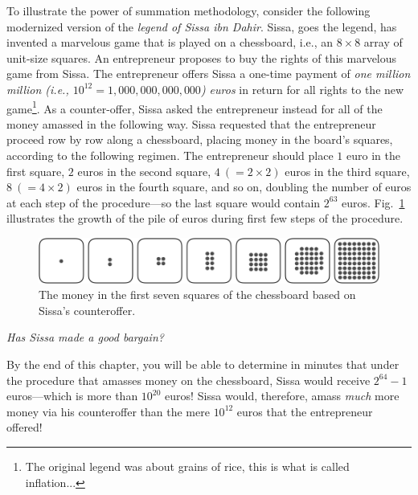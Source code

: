 To illustrate the power of summation methodology, consider the following modernized version of the {\it legend of Sissa ibn Dahir}.  Sissa, goes the legend, has invented a marvelous game that is played on a chessboard, i.e., an $8 \times 8$ array of unit-size squares.  An entrepreneur proposes to buy the rights of this marvelous game from Sissa.  The entrepreneur offers Sissa a one-time payment of {\em one million million (i.e., $10^{12} = 1,000,000,000,000$) euros} in return for all rights to the new game\footnote{The original legend was about grains of rice, this is what is called {inflation}...}.  As a counter-offer, Sissa asked the entrepreneur instead for all of the money amassed in the following way.  Sissa requested that the entrepreneur proceed row by row along a chessboard, placing money in the board's squares, according to the following regimen.  The entrepreneur should place $1$ euro in the first square, $2$ euros in the second square, $4 \ (= 2 \times 2)$ euros in the third square, $8 \ (= 4 \times 2)$ euros in the
fourth square, and so on, doubling the number of euros at each step of the procedure---so the last square would contain $2^{63}$ euros. Fig.~\ref{fig:Sissa} illustrates the growth of the pile of euros during first few steps of the procedure.
\begin{figure}[ht]
\begin{center}
       \includegraphics[scale=0.3]{FiguresMaths/chess}
\caption{The money in the first seven squares of the chessboard based on Sissa's counteroffer.}
       \label{fig:Sissa}
\end{center}
\end{figure}

\medskip

\noindent
{\em Has Sissa made a good bargain?}

\medskip

\noindent
By the end of this chapter, you will be able to determine in minutes that under the procedure that amasses money on the chessboard, Sissa would receive $2^{64} -1$ euros---which is more than $10^{20}$ euros!  Sissa would, therefore, amass {\em much} more money via his counteroffer than the mere $10^{12}$ euros that the entrepreneur offered!

